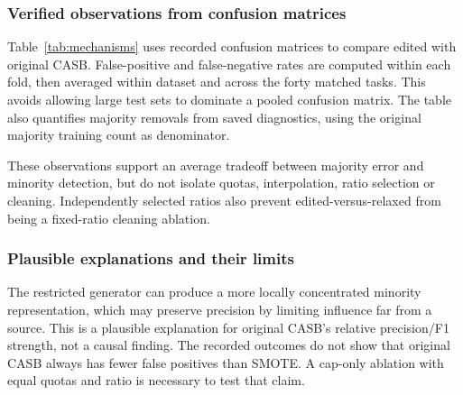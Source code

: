 \documentclass[conference]{IEEEtran}
\begin{document}
\subsubsection{Verified observations from confusion matrices}
Table~\ref{tab:mechanisms} uses recorded confusion matrices to compare edited with original CASB. False-positive and false-negative rates are computed within each fold, then averaged within dataset and across the forty matched tasks. This avoids allowing large test sets to dominate a pooled confusion matrix. The table also quantifies majority removals from saved diagnostics, using the original majority training count as denominator.

These observations support an average tradeoff between majority error and minority detection, but do not isolate quotas, interpolation, ratio selection or cleaning. Independently selected ratios also prevent edited-versus-relaxed from being a fixed-ratio cleaning ablation.
\begin{table}[!htbp]
\centering\small
\caption{Observed error-rate changes (percentage points) for edited minus original CASB, on 40 datasets. Removal is the mean percentage of original majority training observations removed by edited. These paired pipeline comparisons are not component ablations.}\label{tab:mechanisms}
\end{table}

\subsubsection{Plausible explanations and their limits}
The restricted generator can produce a more locally concentrated minority representation, which may preserve precision by limiting influence far from a source. This is a plausible explanation for original CASB's relative precision/F1 strength, not a causal finding. The recorded outcomes do not show that original CASB always has fewer false positives than SMOTE. A cap-only ablation with equal quotas and ratio is necessary to test that claim.
\end{document}
